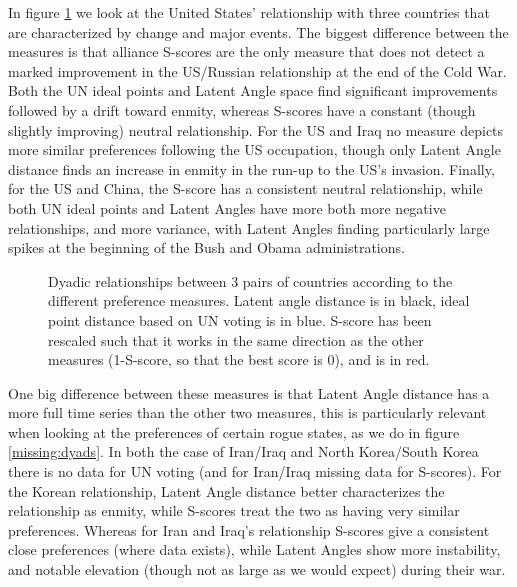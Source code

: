 In figure \ref{unfriendly:dyads} we look at the United States' relationship with three countries that are characterized by change and major events. The biggest difference between the measures is that alliance S-scores are the only measure that does not detect a marked improvement in the US/Russian relationship at the end of the Cold War. Both the UN ideal points and Latent Angle space find significant improvements followed by a drift toward enmity, whereas S-scores have a constant (though slightly improving) neutral relationship. For the US and Iraq no measure depicts more similar preferences following the US occupation, though only Latent Angle distance finds an increase in enmity in the run-up to the US's invasion. Finally, for the US and China, the S-score has a consistent neutral relationship, while both UN ideal points and Latent Angles have more both more negative relationships, and more variance, with Latent Angles finding particularly large spikes at the beginning of the Bush and Obama administrations.

\begin{figure}
\caption{Dyadic relationships between 3 pairs of countries according to the different preference measures. Latent angle distance is in black, ideal point distance based on UN voting is in blue. S-score has been rescaled such that it works in the same direction as the other measures (1-S-score, so that the best score is 0), and is in red.}
\label{unfriendly:dyads}
\end{figure}

One big difference between these measures is that Latent Angle distance has a more full time series than the other two measures, this is particularly relevant when looking at the preferences of certain rogue states, as we do in figure \ref{missing:dyads}. In both the case of Iran/Iraq and North Korea/South Korea there is no data for UN voting (and for Iran/Iraq missing data for S-scores). For the Korean relationship, Latent Angle distance better characterizes  the relationship as enmity, while S-scores treat the two as having very similar preferences. Whereas for Iran and Iraq's relationship S-scores give a consistent close preferences (where data exists), while Latent Angles show more instability, and notable elevation (though not as large as we would expect) during their war.


